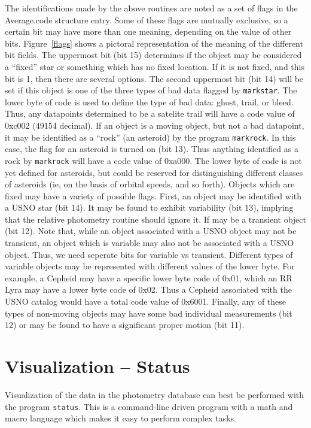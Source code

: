 \documentclass{article}
\begin{document}
The identifications made by the above routines are noted as a set of
flags in the Average.code structure entry.  Some of these flags are
mutually exclusive, so a certain bit may have more than one meaning,
depending on the value of other bits.  Figure~\ref{flags} shows a
pictoral representation of the meaning of the different bit fields.
The uppermost bit (bit 15) determines if the object may be considered
a ``fixed'' star or something which has no fixed location.  If it is
not fixed, and this bit is 1, then there are several options.  The
second uppermost bit (bit 14) will be set if this object is one of the
three types of bad data flagged by {\tt markstar}.  The lower byte of
code is used to define the type of bad data: ghost, trail, or bleed.
Thus, any datapoints determined to be a satelite trail will have a
code value of 0xc002 (49154 decimal).  If an object is a moving
object, but not a bad datapoint, it may be identified as a ``rock''
(an asteroid) by the program {\tt markrock}.  In this case, the flag
for an asteroid is turned on (bit 13).  Thus anything identified as a
rock by {\tt markrock} will have a code value of 0xa000.  The lower
byte of code is not yet defined for asteroids, but could be reserved
for distinguishing different classes of asteroids (ie, on the basis of
orbital speeds, and so forth).  Objects which are fixed may have a
variety of possible flags.  First, an object may be identified with a
USNO star (bit 14).  It may be found to exhibit variability (bit 13),
implying that the relative photometry routine should ignore it.  If
may be a transient object (bit 12).  Note that, while an object
associated with a USNO object may not be transient, an object which is
variable may also not be associated with a USNO object.  Thus, we need
seperate bits for variable vs transient.  Different types of variable
objects may be represented with different values of the lower byte.
For example, a Cepheid may have a specific lower byte code of 0x01,
which an RR Lyra may have a lower byte code of 0x02.  Thus a Cepheid
associated with the USNO catalog would have a total code value of
0x6001. Finally, any of these types of non-moving objects may have
some bad individual measurements (bit 12) or may be found to have a
significant proper motion (bit 11).

\section{Visualization -- Status}

Visualization of the data in the photometry database can best be
performed with the program {\tt status}.  This is a command-line
driven program with a math and macro language which makes it easy to
perform complex tasks.  
\end{document}
